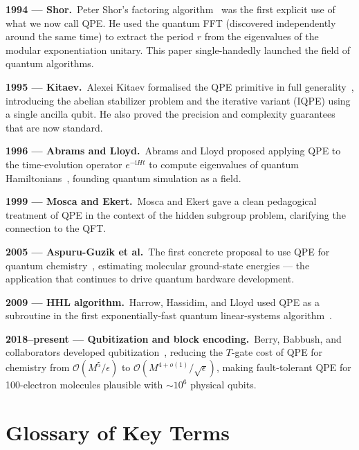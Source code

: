 \documentclass[12pt,a4paper]{article}
\newcommand{\QPE}{\textsc{QPE}}
\newcommand{\ii}{\mathrm{i}}
\newcommand{\bigO}{\mathcal{O}}
\begin{document}
\textbf{1994 — Shor.}\ Peter Shor's factoring algorithm~\cite{shor1994} was the
first explicit use of what we now call \QPE{}.  He used the quantum FFT
(discovered independently around the same time) to extract the period $r$
from the eigenvalues of the modular exponentiation unitary.  This paper single-handedly launched the field of quantum algorithms.

\textbf{1995 — Kitaev.}\ Alexei Kitaev formalised the \QPE{} primitive in
full generality~\cite{kitaev1995}, introducing the abelian stabilizer problem
and the iterative variant (IQPE) using a single ancilla qubit.  He also proved
the precision and complexity guarantees that are now standard.

\textbf{1996 — Abrams and Lloyd.}\ Abrams and Lloyd proposed applying QPE
to the time-evolution operator $e^{-\ii Ht}$ to compute eigenvalues of
quantum Hamiltonians~\cite{abrams1997}, founding quantum simulation as a field.

\textbf{1999 — Mosca and Ekert.}\ Mosca and Ekert gave a clean pedagogical
treatment of QPE in the context of the hidden subgroup problem, clarifying
the connection to the QFT.

\textbf{2005 — Aspuru-Guzik et al.}\ The first concrete proposal to use
QPE for quantum chemistry~\cite{aspuru2005}, estimating molecular ground-state
energies — the application that continues to drive quantum hardware development.

\textbf{2009 — HHL algorithm.}\ Harrow, Hassidim, and Lloyd used QPE
as a subroutine in the first exponentially-fast quantum linear-systems
algorithm~\cite{harrow2009}.

\textbf{2018--present — Qubitization and block encoding.}\ Berry, Babbush,
and collaborators developed qubitization~\cite{babbush2019,berry2019},
reducing the $T$-gate cost of QPE for chemistry from $\bigO(M^5/\epsilon)$
to $\bigO(M^{4+o(1)}/\sqrt{\epsilon})$, making fault-tolerant QPE for
100-electron molecules plausible with $\sim 10^6$ physical qubits.

\newpage

\section{Glossary of Key Terms}
\label{app:glossary}
\end{document}
